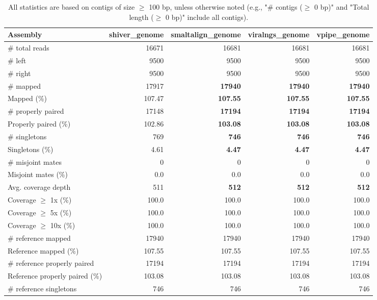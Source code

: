 \documentclass[12pt,a4paper]{article}
\begin{document}
\begin{table}[ht]
\begin{center}
\caption{All statistics are based on contigs of size $\geq$ 100 bp, unless otherwise noted (e.g., "\# contigs ($\geq$ 0 bp)" and "Total length ($\geq$ 0 bp)" include all contigs).}
\begin{tabular}{|l*{4}{|r}|}
\hline
Assembly & shiver\_genome & smaltalign\_genome & viralngs\_genome & vpipe\_genome \\ \hline
\# total reads & 16671 & 16681 & 16681 & 16681 \\ \hline
\# left & 9500 & 9500 & 9500 & 9500 \\ \hline
\# right & 9500 & 9500 & 9500 & 9500 \\ \hline
\# mapped & 17917 & {\bf 17940} & {\bf 17940} & {\bf 17940} \\ \hline
Mapped (\%) & 107.47 & {\bf 107.55} & {\bf 107.55} & {\bf 107.55} \\ \hline
\# properly paired & 17148 & {\bf 17194} & {\bf 17194} & {\bf 17194} \\ \hline
Properly paired (\%) & 102.86 & {\bf 103.08} & {\bf 103.08} & {\bf 103.08} \\ \hline
\# singletons & 769 & {\bf 746} & {\bf 746} & {\bf 746} \\ \hline
Singletons (\%) & 4.61 & {\bf 4.47} & {\bf 4.47} & {\bf 4.47} \\ \hline
\# misjoint mates & 0 & 0 & 0 & 0 \\ \hline
Misjoint mates (\%) & 0.0 & 0.0 & 0.0 & 0.0 \\ \hline
Avg. coverage depth & 511 & {\bf 512} & {\bf 512} & {\bf 512} \\ \hline
Coverage $\geq$ 1x (\%) & 100.0 & 100.0 & 100.0 & 100.0 \\ \hline
Coverage $\geq$ 5x (\%) & 100.0 & 100.0 & 100.0 & 100.0 \\ \hline
Coverage $\geq$ 10x (\%) & 100.0 & 100.0 & 100.0 & 100.0 \\ \hline
\# reference mapped & 17940 & 17940 & 17940 & 17940 \\ \hline
Reference mapped (\%) & 107.55 & 107.55 & 107.55 & 107.55 \\ \hline
\# reference properly paired & 17194 & 17194 & 17194 & 17194 \\ \hline
Reference properly paired (\%) & 103.08 & 103.08 & 103.08 & 103.08 \\ \hline
\# reference singletons & 746 & 746 & 746 & 746 \\ \hline

\end{tabular}
\end{center}
\end{table}
\end{document}
